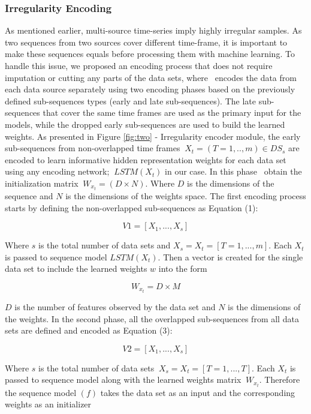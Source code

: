 \documentclass[conference]{IEEEtran}
\begin{document}
 \subsubsection{Irregularity Encoding}
 As mentioned earlier, multi-source time-series imply highly irregular samples. As two sequences from two sources cover different time-frame, it is important to make these sequences equals before processing them with machine learning.  To handle this issue, we proposed an encoding process that does not require imputation or cutting any parts of the data sets, where \name\ encodes the data from each data source separately using two encoding phases based on the previously defined sub-sequences types (early and late sub-sequences). The late sub-sequences that cover the same time frames are used as the primary input for the models, while the dropped early sub-sequences are used to build the learned weights.  As presented in  Figure \ref{fig:two} - Irregularity encoder module, the early sub-sequences from non-overlapped time frames  $\ X_{t} = (T=1,..,m) \in DS_{s}$ are encoded to learn informative hidden representation weights for each data set using any encoding network; $\ LSTM(X_{t})$ in our case. In this phase  \name\  obtain the initialization matrix $\ W_{x_{t}} = (D  \times  N) $. Where $D$ is the dimensions of the sequence and $N$ is the dimensions of the weights space. The first encoding process starts by defining the non-overlapped sub-sequences as Equation (1): 

\begin{equation}
V1 = [X_{1},...,X_{s}]
\end{equation}

Where $s$ is the total number of data sets and $X_{s} =X_{t} =[T= 1,...,m]$. Each $X_{t}$  is passed to sequence model $LSTM(X_{t})$. Then a vector is created for the single data set to include the learned weights $w$ into the form


\begin{equation}
W_{x_{t}} = D \times M
\end{equation}

$D$ is the number of features observed by the data set and $N$ is the dimensions of the weights. In the second phase, all the overlapped sub-sequences from all data sets are defined and encoded as Equation (3):

\begin{equation}
V2 = [X_{1},...,X_{s}]
\end{equation}

Where $s$ is the total number of data sets $\ X_{s} =X_{t} =[T= 1,...,T]$. Each $X_{t}$  is passed to sequence model along with the learned weights matrix  $\ W_{x_{t}} $. Therefore the sequence model $(f)$ takes the data set as an input and the corresponding weights as an initializer 
\end{document}
